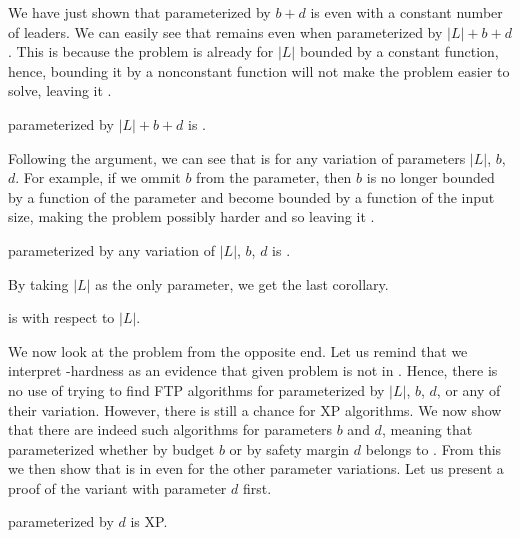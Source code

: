 We have just shown that \HL parameterized by $b+d$ is \Wh even with a constant number of leaders.
We can easily see that \HLshort remains \Wh even when parameterized by $|L|+b+d$.
This is because the problem is \Wh already for $|L|$ bounded by a constant function,
hence, bounding it by a nonconstant function will not make the problem easier to solve, leaving it \Wh.

\begin{remark}\label{cor:LnBD:Wh}
    \HL parameterized by $|L|+b+d$ is \Wh.
\end{remark}

Following the argument, we can see that \HL is \Wh for any variation of parameters $|L|$, $b$, $d$.
For example, if we ommit $b$ from the parameter, then $b$ is no longer bounded by a function of the parameter and
become bounded by a function of the input size, making the problem possibly harder and so leaving it \Wh.

\begin{corollary}\label{cor:LnBD:variation:Wh}
    \HL parameterized by any variation of $|L|$, $b$, $d$ is \Wh.
\end{corollary}

By taking $|L|$ as the only parameter, we get the last corollary.

\begin{corollary}\label{cor:Ln:pNPh}
    \HL is \pNPh with respect to $|L|$.
\end{corollary}


We now look at the problem from the opposite end.
Let us remind that we interpret \W-hardness as an evidence that given problem is not in \FPT.
Hence, there is no use of trying to find FTP algorithms for \HL parameterized by $|L|$, $b$, $d$, or any of their variation.
However, there is still a chance for XP algorithms.
We now show that there are indeed such algorithms for parameters $b$ and $d$, meaning that
\HL parameterized whether by budget $b$ or by safety margin $d$ belongs to \XP.
From this we then show that \HLshort is in \XP even for the other parameter variations.
Let us present a proof of the variant with parameter $d$ first.

\begin{theorem}\label{theorem:D:XP}
    \HL parameterized by $d$ is XP.
\end{theorem}

